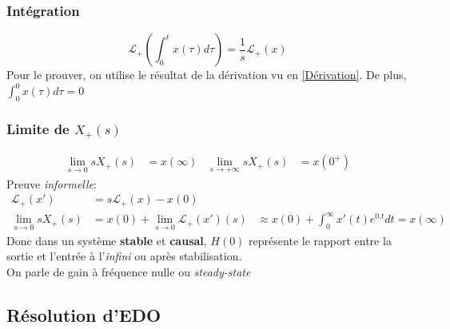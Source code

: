 \documentclass{report}
\begin{document}
\subsubsection{Intégration}
\begin{equation}
\mathcal{L}_+ \left( \int_0^t x(\tau ) d \tau \right) = \frac{1}{s} \mathcal{L}_+ (x)
\end{equation}
Pour le prouver, on utilise le résultat de la dérivation vu en \ref{Dérivation}. De plus, $\int_0^0 x(\tau ) d \tau = 0$

\subsubsection{Limite de $X_+(s)$}
\begin{align}
\lim_{s \rightarrow 0} s X_+ (s) &= x(\infty) & \lim_{s \rightarrow + \infty} s X_+ (s) &= x(0^+)
\end{align}
Preuve \textit{informelle}:
\begin{align*}
\mathcal{L}_+ (x') &= s \mathcal{L}_+ (x) - x(0)\\
\lim_{s \rightarrow 0} sX_+ (s) &= x(0) + \lim_{s \rightarrow 0} \mathcal{L}_+ (x')(s)
& \approx x(0) + \int_0^{\infty} x'(t) e^{0.t} dt = x(\infty)
\end{align*}
Donc dans un système \textbf{stable} et \textbf{causal}, $H(0)$ représente le rapport entre la sortie et l'entrée à l'\textit{infini} ou après stabilisation.\\
On parle de gain à fréquence nulle ou \textit{steady-state}


\subsection{Résolution d'EDO}
\end{document}
